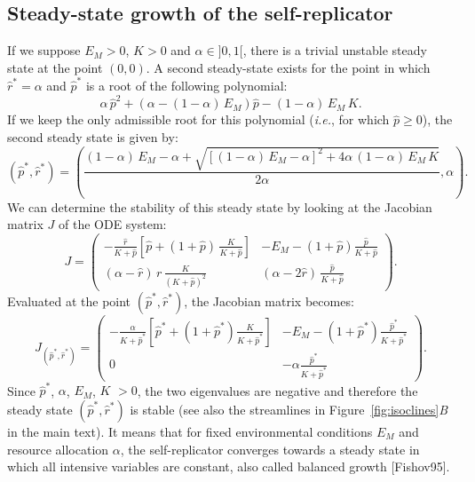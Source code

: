 \subsection{Steady-state growth of the self-replicator}
\label{si::growthrate}

If we suppose $E_M > 0$, $K > 0$ and $\alpha \in ]0, 1[$, there is a trivial unstable steady state at the point $(0, 0)$.
A second steady-state exists for the point in which $\hat{r}^* = \alpha$ and $\hat{p}^*$ is a root of the following polynomial:
\[
\alpha \, \hat{p}^2 + \left(\alpha - (1-\alpha) \, E_M \right) \hat{p} - (1-\alpha)\, E_M\, K.
\]
If we keep the only admissible root for this polynomial (\textit{i.e.}, for which $\hat{p} \geq 0$), the second steady state is given by:
\begin{equation}
\label{eq:sup_steadystate}
(\hat{p}^*, \hat{r}^*) = \left( \frac{(1-\alpha)\, E_M - \alpha + \sqrt{[(1-\alpha)\, E_M - \alpha]^2 + 4\alpha\, (1-\alpha)\, E_M\, K}}{2\alpha}, \alpha \right).
\end{equation}
We can determine the stability of this steady state by looking at the Jacobian matrix $J$ of the ODE system:
\begin{equation}
\label{eq:sup_jacop}
J = \left(\begin{matrix}
- \frac{\hat{r}}{K + \hat{p}} \left[ \hat{p} + (1+\hat{p})\, \frac{K}{K+\hat{p}}\right] & - E_M - (1+\hat{p})\frac{\hat{p}}{K+\hat{p}}\\
(\alpha - \hat{r})\, r \, \frac{K}{(K+\hat{p})^2} & (\alpha - 2\hat{r})\, \frac{\hat{p}}{K+\hat{p}}
\end{matrix}\right) .
\end{equation}
Evaluated at the point $(\hat{p}^*, \hat{r}^*)$, the Jacobian matrix becomes:
\[
J_{(\hat{p}^*, \hat{r}^*)} = \left(\begin{matrix}
- \frac{\alpha}{K + \hat{p}^*} \left[ \hat{p}^* + (1+\hat{p}^*)\frac{K}{K+\hat{p}^*}\right] & - E_M - (1+\hat{p}^*)\frac{\hat{p}^*}{K+\hat{p}^*}\\
0 & -\alpha\frac{\hat{p}^*}{K+\hat{p}^*}
\end{matrix}\right).
\]
Since $\hat{p}^*$, $\alpha$, $E_M$, $K$ $>0$, the two eigenvalues are negative and therefore the steady state $(\hat{p}^*, \hat{r}^*)$ is stable (see also the streamlines in Figure~\ref{fig:isoclines}\textit{B} in the main text).
It means that for fixed environmental conditions $E_M$ and resource allocation $\alpha$, the self-replicator converges towards a steady state in which all intensive variables are constant, also called balanced growth [Fishov95].

